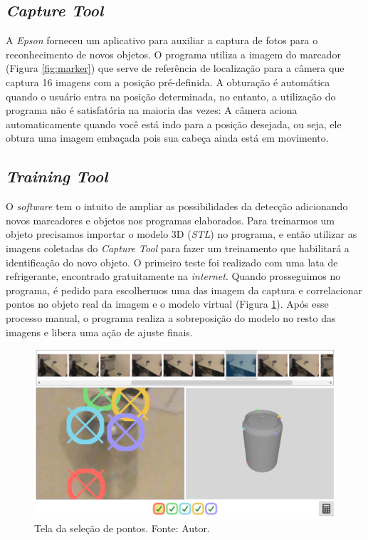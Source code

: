 \subsection{\textit{Capture Tool}}

A \textit{Epson} forneceu um aplicativo para auxiliar a captura de fotos para o reconhecimento de novos objetos. O programa utiliza a imagem do marcador (Figura \ref{fig:marker}) que serve de referência de localização para a câmera que captura 16 imagens com a posição pré-definida. A obturação é automática quando o usuário entra na posição determinada, no entanto, a utilização do programa não é satisfatória na maioria das vezes: A câmera aciona automaticamente quando você está indo para a posição desejada, ou seja, ele obtura uma imagem embaçada pois sua cabeça ainda está em movimento.

\subsection{\textit{Training Tool}}

O \textit{software} tem o intuito de ampliar as possibilidades da detecção adicionando novos marcadores e objetos nos programas elaborados. Para treinarmos um  objeto precisamos importar o modelo 3D (\textit{STL}) no programa, e então utilizar as imagens coletadas do \textit{Capture Tool} para fazer um treinamento que habilitará a identificação do novo objeto. O primeiro teste foi realizado com uma lata de refrigerante, encontrado gratuitamente na \textit{internet}. Quando prosseguimos no programa, é pedido para escolhermos uma das imagem da captura e correlacionar pontos no objeto real da imagem e o modelo virtual (Figura \ref{fig:train-pt}). Após esse processo manual, o programa realiza a sobreposição do modelo no resto das imagens e libera uma ação de ajuste finais.

\begin{figure}[ht]
    \centering
    \includegraphics[width=.6\linewidth]{figuras/TrainingPoints.png}
    \caption{Tela da seleção de pontos. Fonte: Autor.}
    \label{fig:train-pt}
\end{figure}

